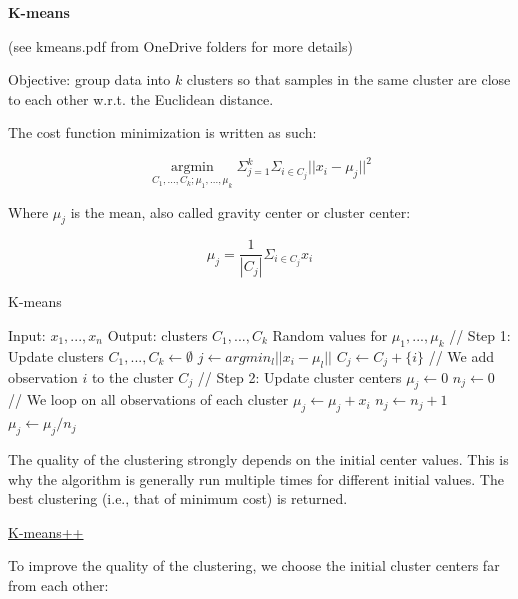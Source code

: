 {\fontsize{12pt}{22pt} \textbf{K-means}\par}

\vspace{5mm}

(see kmeans.pdf from OneDrive folders for more details)

\vspace{5mm}

Objective: group data into $k$ clusters so that samples in the same cluster are close to each other w.r.t. the Euclidean distance.

\vspace{5mm}
The cost function minimization is written as such:

$$\underset{C_1,...,C_k;\mu_1,...,\mu_k}{\operatorname{argmin}}\Sigma_{j=1}^k\Sigma_{i \in C_j}||x_i-\mu_j||^2$$

Where $\mu_j$ is the mean, also called gravity center or cluster center:

$$\mu_j=\frac{1}{|C_j|}\Sigma_{i \in C_j}x_i$$

\begin{algorithm}
\caption{K-means}
\begin{algorithmic}
\State Input: $x_1,...,x_n$
\State Output: clusters $C_1,...,C_k$
Random values for $\mu_1,...,\mu_k$
\State // Step 1: Update clusters
\State $C_1,...,C_k \leftarrow \emptyset$
\State $j \leftarrow argmin_l ||x_i - \mu_l||$
\State $C_j \leftarrow C_j + \{i\}$ // We add observation $i$ to the cluster $C_j$
\EndFor
\State // Step 2: Update cluster centers
\State $\mu_j \leftarrow 0$
\State $n_j \leftarrow 0$
 // We loop on all observations of each cluster
\State $\mu_j \leftarrow \mu_j + x_i$
\State $n_j \leftarrow n_j +1$
\EndFor
\State $\mu_j \leftarrow \mu_j /n_j$
\EndFor
\EndWhile
\end{algorithmic}
\end{algorithm}

The quality of the clustering strongly depends on the initial center values. This is why the algorithm is generally run multiple times for different initial values. The best clustering (i.e., that of minimum cost) is returned.

\vspace{5mm}

\underline{K-means++}

To improve the quality of the clustering, we choose the initial cluster centers far from each other:

